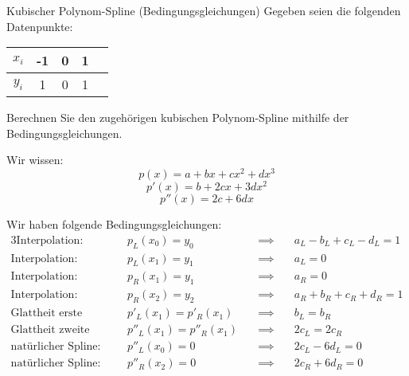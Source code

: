 \begin{example}{Kubischer Polynom-Spline (Bedingungsgleichungen)}
    Gegeben seien die folgenden Datenpunkte: 
    
    \begin{center}
        \begin{tabular}{|c||c|c|c|c|}
            \hline
            $x_i$ & -1 & 0 & 1 \\ 
            \hline
            $y_i$ & 1  & 0 & 1 \\
            \hline
        \end{tabular}
    \end{center}
    
    Berechnen Sie den zugehörigen kubischen Polynom-Spline mithilfe der Bedingungsgleichungen.
    
    \exampleseparator
    
    Wir wissen: 
    \[ 
        p(x) = a + bx + cx^2 + dx^3
    \]
    \[ 
        p'(x) = b + 2cx + 3dx^2
    \]
    \[ 
        p''(x) = 2c + 6dx
    \]
    
    Wir haben folgende Bedingungsgleichungen:
    \begin{alignat*}{3}
        \text{Interpolation:} \qquad              & p_L(x_0)       = y_0        \quad & \implies \quad & a_L - b_L + c_L - d_L =  1 \\
        \text{Interpolation:} \qquad              & p_L(x_1)       = y_1        \quad & \implies \quad & a_L =  0                   \\
        \text{Interpolation:} \qquad              & p_R(x_1)       = y_1        \quad & \implies \quad & a_R = 0                    \\
        \text{Interpolation:} \qquad              & p_R(x_2)       = y_2        \quad & \implies \quad & a_R + b_R + c_R + d_R = 1  \\
        \text{Glattheit erste Ableitung:} \qquad  & p'_L(x_1)      = p'_R(x_1)  \quad & \implies \quad & b_L = b_R                  \\
        \text{Glattheit zweite Ableitung:} \qquad & p''_L(x_1)     = p''_R(x_1) \quad & \implies \quad & 2c_L = 2c_R                \\
        \text{natürlicher Spline:} \qquad         & p''_L(x_0)     = 0          \quad & \implies \quad & 2c_L - 6d_L = 0            \\
        \text{natürlicher Spline:} \qquad         & p''_R(x_2) =     0          \quad & \implies \quad & 2c_R + 6d_R = 0
    \end{alignat*}
    

\end{example}
